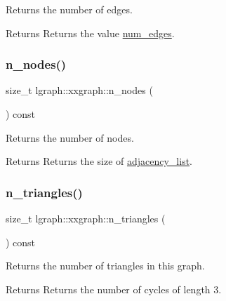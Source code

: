 Returns the number of edges. 

\begin{DoxyReturn}{Returns}
Returns the value \hyperlink{classlgraph_1_1xxgraph_a6765a9a3be42f6e0f824635c593b35d7}{num\+\_\+edges}. 
\end{DoxyReturn}
\mbox{\label{classlgraph_1_1xxgraph_a67f651617ada4053b569102b9a54cab0}} 
\subsubsection{\texorpdfstring{n\+\_\+nodes()}{n\_nodes()}}
{\footnotesize\ttfamily size\+\_\+t lgraph\+::xxgraph\+::n\+\_\+nodes (\begin{DoxyParamCaption}{ }\end{DoxyParamCaption}) const}



Returns the number of nodes. 

\begin{DoxyReturn}{Returns}
Returns the size of \hyperlink{classlgraph_1_1xxgraph_a31cf82d0b20be05290be259dc97a51ec}{adjacency\+\_\+list}. 
\end{DoxyReturn}
\mbox{\label{classlgraph_1_1xxgraph_a90a9b60caf18179576af61dc962b95e3}} 
\subsubsection{\texorpdfstring{n\+\_\+triangles()}{n\_triangles()}}
{\footnotesize\ttfamily size\+\_\+t lgraph\+::xxgraph\+::n\+\_\+triangles (\begin{DoxyParamCaption}{ }\end{DoxyParamCaption}) const}



Returns the number of triangles in this graph. 

\begin{DoxyReturn}{Returns}
Returns the number of cycles of length 3. 
\end{DoxyReturn}
\mbox{\label{classlgraph_1_1xxgraph_a46a75fa2a10a8674ab930e9dc766e2f9}} 
